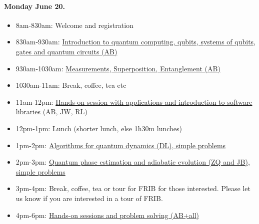 \documentclass[%
oneside,                 %
final,                   %
10pt]{article}
\begin{document}
\paragraph{Monday June 20.}
\begin{itemize}
\item 8am-830am: Welcome and registration

\item 830am-930am: \href{{https://nuclearphysicsworkshops.github.io/FRIB-TASummerSchoolQuantumComputing/doc/web/course.html}}{Introduction to quantum computing, qubits, systems of qubits, gates and quantum circuits (AB)}

\item 930am-1030am: \href{{https://nuclearphysicsworkshops.github.io/FRIB-TASummerSchoolQuantumComputing/doc/web/course.html}}{Measurements, Superposition, Entanglement (AB)}

\item 1030am-11am: Break, coffee, tea etc

\item 11am-12pm: \href{{https://nuclearphysicsworkshops.github.io/FRIB-TASummerSchoolQuantumComputing/doc/web/course.html}}{Hands-on session with applications and introduction to software libraries (AB, JW, RL)}

\item 12pm-1pm: Lunch (shorter lunch, else 1h30m lunches)

\item 1pm-2pm: \href{{https://nuclearphysicsworkshops.github.io/FRIB-TASummerSchoolQuantumComputing/doc/web/course.html}}{Algorithms for quantum dynamics (DL), simple problems}

\item 2pm-3pm: \href{{https://nuclearphysicsworkshops.github.io/FRIB-TASummerSchoolQuantumComputing/doc/web/course.html}}{Quantum phase estimation and adiabatic evolution (ZQ and JB), simple problems}

\item 3pm-4pm: Break, coffee, tea or tour for FRIB for those interested. Please let us know if you are interested in a tour of FRIB.

\item 4pm-6pm: \href{{https://nuclearphysicsworkshops.github.io/FRIB-TASummerSchoolQuantumComputing/doc/web/course.html}}{Hands-on sessions and problem solving (AB+all)}
\end{itemize}

\noindent
\end{document}
